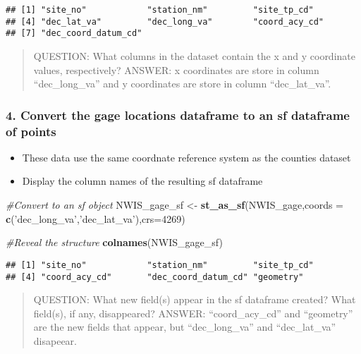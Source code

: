 \documentclass[]{article}
\newenvironment{Shaded}{\begin{snugshade}}{\end{snugshade}}
\newcommand{\KeywordTok}[1]{\textcolor[rgb]{0.13,0.29,0.53}{\textbf{#1}}}
\newcommand{\DataTypeTok}[1]{\textcolor[rgb]{0.13,0.29,0.53}{#1}}
\newcommand{\DecValTok}[1]{\textcolor[rgb]{0.00,0.00,0.81}{#1}}
\newcommand{\StringTok}[1]{\textcolor[rgb]{0.31,0.60,0.02}{#1}}
\newcommand{\CommentTok}[1]{\textcolor[rgb]{0.56,0.35,0.01}{\textit{#1}}}
\newcommand{\NormalTok}[1]{#1}
\providecommand{\tightlist}{%
  \setlength{\itemsep}{0pt}\setlength{\parskip}{0pt}}
\begin{document}
\begin{verbatim}
## [1] "site_no"            "station_nm"         "site_tp_cd"        
## [4] "dec_lat_va"         "dec_long_va"        "coord_acy_cd"      
## [7] "dec_coord_datum_cd"
\end{verbatim}

\begin{quote}
QUESTION: What columns in the dataset contain the x and y coordinate
values, respectively? ANSWER: x coordinates are store in column
``dec\_long\_va'' and y coordinates are store in column
``dec\_lat\_va''.
\end{quote}

\subsubsection{4. Convert the gage locations dataframe to an sf
dataframe of
points}\label{convert-the-gage-locations-dataframe-to-an-sf-dataframe-of-points}

\begin{itemize}
\tightlist
\item
  These data use the same coordnate reference system as the counties
  dataset
\item
  Display the column names of the resulting sf dataframe
\end{itemize}

\begin{Shaded}
\begin{Highlighting}[]
\CommentTok{#Convert to an sf object}
\NormalTok{NWIS_gage_sf <-}\StringTok{ }\KeywordTok{st_as_sf}\NormalTok{(NWIS_gage,}\DataTypeTok{coords =} \KeywordTok{c}\NormalTok{(}\StringTok{'dec_long_va'}\NormalTok{,}\StringTok{'dec_lat_va'}\NormalTok{),}\DataTypeTok{crs=}\DecValTok{4269}\NormalTok{)}

\CommentTok{#Reveal the structure}
\KeywordTok{colnames}\NormalTok{(NWIS_gage_sf)}
\end{Highlighting}
\end{Shaded}

\begin{verbatim}
## [1] "site_no"            "station_nm"         "site_tp_cd"        
## [4] "coord_acy_cd"       "dec_coord_datum_cd" "geometry"
\end{verbatim}

\begin{quote}
QUESTION: What new field(s) appear in the sf dataframe created? What
field(s), if any, disappeared? ANSWER: ``coord\_acy\_cd'' and
``geometry'' are the new fields that appear, but ``dec\_long\_va'' and
``dec\_lat\_va'' disapeear.
\end{quote}
\end{document}
